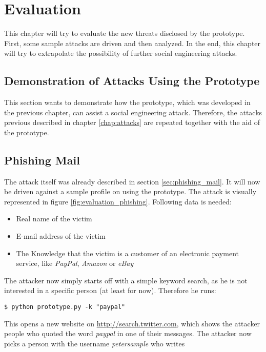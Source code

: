 \chapter{Evaluation}
\label{chap:evaluation}

This chapter will try to evaluate the new threats disclosed by the prototype.
First, some sample attacks are driven and then analyzed. In the end, this
chapter will try to extrapolate the possibility of further social engineering
attacks.

\section{Demonstration of Attacks Using the Prototype}

This section wants to demonstrate how the prototype, which was
developed in the previous chapter, can assist a social engineering attack.
Therefore, the attacks previous described in chapter \ref{chap:attacks} are
repeated together with the aid of the prototype.

\section{Phishing Mail}

The attack itself was already described in section \ref{sec:phishing_mail}. It
will now be driven against a sample profile on \Twitter{} using the prototype.
The attack is visually represented in figure \ref{fig:evaluation_phishing}.
Following data is needed:

\begin{itemize}
  \item Real name of the victim
  \item E-mail address of the victim
  \item The Knowledge that the victim is a customer of an electronic
  payment service, like \textit{PayPal}, \textit{Amazon} or \textit{eBay}
\end{itemize}

The attacker now simply starts off with a simple keyword search, as he is not
interested in a specific person (at least for now). Therefore he runs:

\lstset{language=bash}
\begin{lstlisting}
$ python prototype.py -k "paypal"
\end{lstlisting}

This opens a new website on \url{http://search.twitter.com}, which shows the
attacker people who quoted the word \textit{paypal} in one of their messages.
The attacker now picks a person with the username \textit{petersample} who writes

